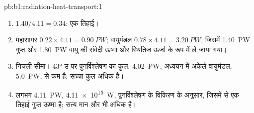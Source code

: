 \begin{solution}{pb:b1:radiation-heat-transport:1}
\begin{enumerate}
  \item $1.40/4.11 = 0.34$: एक तिहाई।
  \item महासागर $0.22 \times 4.11 = \qty{0.90}{PW}$; वायुमंडल $0.78 \times 4.11 =
        \qty{3.20}{PW}$, जिसमें \qty{1.40}{PW} गुप्त और \qty{1.80}{PW}
        वायु की संवेदी ऊष्मा और स्थितिज ऊर्जा के रूप में ले जाया गया।
  \item निचली सीमा। \ang{43} उ पर पुनर्विश्लेषण का कुल, \qty{4.02}{PW}, अध्ययन में अकेले वायुमंडल, \qty{5.0}{PW}, से कम है; सच्चा कुल अधिक है।
  \item लगभग \qty{4.11}{PW}, \qty{4.11e15}{W}, पुनर्विश्लेषण के विकिरण के अनुसार, जिसमें से एक तिहाई गुप्त ऊष्मा है; सत्य मान और भी अधिक है।
\end{enumerate}
\end{solution}
